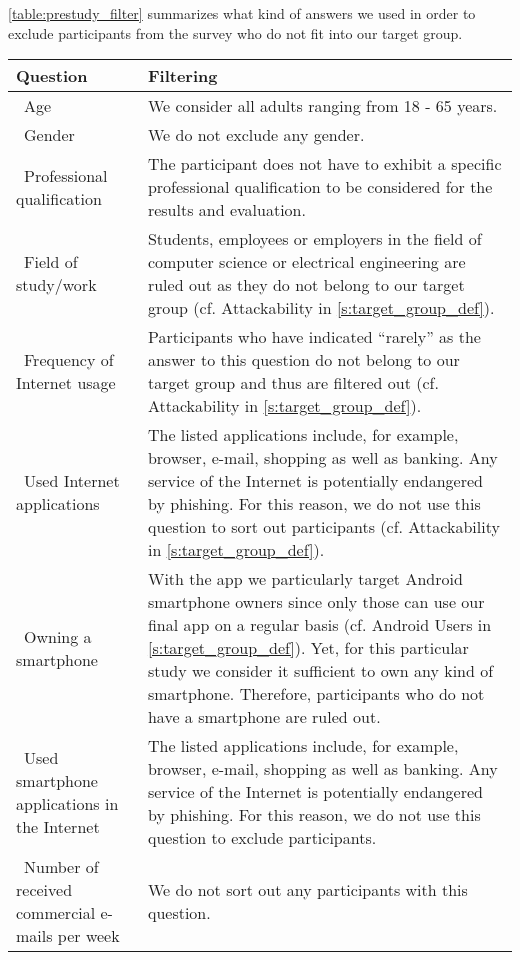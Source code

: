 \autoref{table:prestudy_filter} summarizes what kind of answers we used in order to exclude participants from the survey who do not fit into our target group.
\begin{table}[hHtbp]
\centering
    \begin{tabular}{ | p{4.5cm} | p{10cm} |}
    \hline\textbf{Question} & \textbf{Filtering}  \\  \hline
		\hline\  Age & We consider all adults ranging from 18 - 65 years.
 \\
    \hline\  Gender & We do not exclude any gender.
 \\ 
    \hline\  Professional qualification & The participant does not have to exhibit a specific professional qualification to be considered for the results and evaluation.
 \\ 
		\hline\  Field of study/work & Students, employees or employers in the field of computer science or electrical engineering are ruled out as they do not belong to our target group (cf. Attackability in \autoref{s:target_group_def}).
 \\ 
	  \hline\ Frequency of Internet usage & Participants who have indicated ``rarely'' as the answer to this question do not belong to our target group and thus are filtered out (cf. Attackability in \autoref{s:target_group_def}).
 \\ 
	  \hline\ Used Internet applications  &  The listed applications include, for example, browser, e-mail, shopping as well as banking.
 Any service of the Internet is potentially endangered by phishing.
 For this reason, we do not use this question to sort out participants (cf. Attackability in \autoref{s:target_group_def}).
\\ 
    \hline\ Owning a smartphone  & With the app we particularly target Android smartphone owners since only those can use our final app on a regular basis (cf. Android Users in \autoref{s:target_group_def}).
 Yet, for this particular study we consider it sufficient to own any kind of smartphone.
Therefore, participants who do not have a smartphone are ruled out.
 \\
		\hline\ Used smartphone applications in the Internet  & The listed applications include, for example, browser, e-mail, shopping as well as banking.
 Any service of the Internet is potentially endangered by phishing.
 For this reason, we do not use this question to exclude participants.
 \\
    \hline\ Number of received commercial e-mails per week  & We do not sort out any participants with this question.

\end{tabular}
\end{table}
